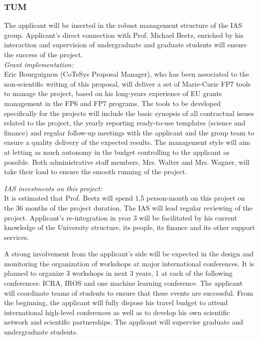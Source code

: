 \subsubsection{TUM}
The applicant will be inserted in the robust management structure of the IAS group. 
Applicant's direct connection with Prof. Michael Beetz, enriched by his interaction 
and supervision of undergraduate and graduate students  will ensure the success of the project. \\
\emph{Grant implementation:}\\
Eric Bourguignon  (CoTeSys Proposal Manager), who  has been associated
to the  non-scientific writing of  this proposal, will deliver  a
set of Marie-Curie FP7  tools to manage the  project, based on
his long-years experience  of EU grants management in  the FP6 and FP7
programs. The tools to be developed specifically for the projects will
include the  basic synopsis of  all contractual issues related  to the
project,  the  yearly reporting  ready-to-use  templates (science  and
finance) and regular follow-up meetings  with the applicant and the group 
team to ensure  a quality  delivery of  the expected  results.  The management
style will aim  at letting as much autonomy  in the budget controlling
to the applicant as possible. Both  administrative staff members, Mrs. Walter and
Mrs. Wagner, will take their load  to ensure the smooth running of the
project.

\emph{IAS investments on this project:}\\
It is estimated  that Prof. Beetz will spend  1,5 person-month on this
project on the 36 months of  the project duration. The IAS will lead
regular  reviewing of the  project. Applicant's re-integration
in  year  3  will  be  facilitated  by his  current  knowledge  of  the
University  structure,  its people,  its  finance and  its other  support
services.


A strong involvement from the applicant's side will be expected in the design
and  monitoring  the organization   of  workshops at  major international
conferences. It is planned to organize 3 workshops in next 3 years, 1 at each of the
following conferences: ICRA, IROS and one machine learning conference. The applicant  will  coordinate  teams of
students  to  ensure  that  these  events are  successful.   From  the
beginning,  the applicant will fully  dispose his  travel budget  to attend
international  high-level conferences  as well  as to  develop  his own
scientific  network  and scientific  partnerships.   The applicant will  supervise
graduate and undergraduate students.

